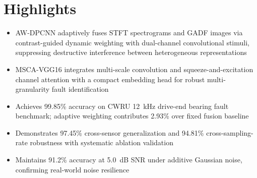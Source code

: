 \documentclass{article}
\begin{document}
	
\section*{Highlights}

\begin{itemize}
	\item AW-DPCNN adaptively fuses STFT spectrograms and GADF images via contrast-guided dynamic weighting with dual-channel convolutional stimuli, suppressing destructive interference between heterogeneous representations
	\item MSCA-VGG16 integrates multi-scale convolution and squeeze-and-excitation channel attention with a compact embedding head for robust multi-granularity fault identification
	\item Achieves 99.85\% accuracy on CWRU 12~kHz drive-end bearing fault benchmark; adaptive weighting contributes 2.93\% over fixed fusion baseline
	\item Demonstrates 97.45\% cross-sensor generalization and 94.81\% cross-sampling-rate robustness with systematic ablation validation
	\item Maintains 91.2\% accuracy at 5.0~dB SNR under additive Gaussian noise, confirming real-world noise resilience
\end{itemize}
\end{document}
